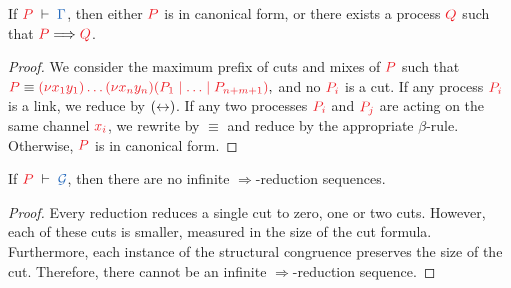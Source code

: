 \documentclass[envcountsame,UKenglish]{llncs}
\begin{document}
\begin{theorem}[Progress]\label{thm:hcp-progress}
  If $\seq[P]{\Gamma}$, then either $\tm{P}$ is in canonical form, or there exists a process $\tm{Q}$ such that $\tm{P}\Longrightarrow\tm{Q}$.
\end{theorem} 
\begin{proof}
  We consider the maximum prefix of cuts and mixes of $\tm{P}$ such that
  \(
  \tm{P} \equiv \tm{\piNew{x_1}{y_1}{\dots\piNew{x_n}{y_n}{(P_1 \ppar \dots \ppar P_{n+m+1})}}},
  \)
  and no $\tm{P_i}$ is a cut. If any process $\tm{P_i}$ is a link, we reduce by $({\leftrightarrow})$. If any two processes $\tm{P_i}$ and $\tm{P_j}$ are acting on the same channel $\tm{x_i}$, we rewrite by $\equiv$ and reduce by the appropriate $\beta$-rule. Otherwise, $\tm{P}$ is in canonical form.
\end{proof}
\begin{theorem}[Termination]\label{thm:hcp-termination}
  If $\seq[P]{\mathcal{G}}$, then there are no infinite $\Longrightarrow$-reduction sequences.
\end{theorem} 
\begin{proof}
  Every reduction reduces a single cut to zero, one or two cuts. However, each of these cuts is smaller, measured in the size of the cut formula. Furthermore, each instance of the structural congruence preserves the size of the cut. Therefore, there cannot be an infinite $\Longrightarrow$-reduction sequence.
\end{proof}
\end{document}

